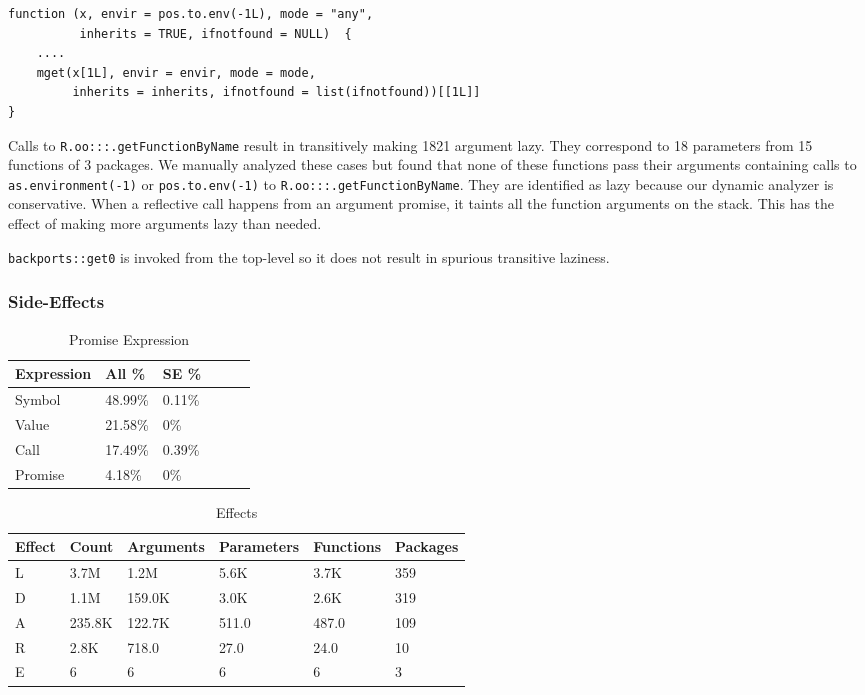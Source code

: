 \documentclass[review,nonacm,screen,acmsmall,anonymous=true]{acmart}
\newcommand{\code}[1]{\lstinline |#1|\xspace}
\begin{document}
\begin{lstlisting}
function (x, envir = pos.to.env(-1L), mode = "any",
          inherits = TRUE, ifnotfound = NULL)  {
    ....
    mget(x[1L], envir = envir, mode = mode,
         inherits = inherits, ifnotfound = list(ifnotfound))[[1L]]
}
\end{lstlisting}

Calls to \code{R.oo:::.getFunctionByName} result in transitively making 1821
argument lazy. They correspond to 18 parameters from 15 functions of 3 packages.
We manually analyzed these cases but found that none of these functions pass
their arguments containing calls to \code{as.environment(-1)} or
\code{pos.to.env(-1)} to \code{R.oo:::.getFunctionByName}. They are identified
as lazy because our dynamic analyzer is conservative. When a reflective call
happens from an argument promise, it taints all the function arguments on the
stack. This has the effect of making more arguments lazy than needed.

\code{backports::get0} is invoked from the top-level so it does not result in
spurious transitive laziness.

\subsubsection{Side-Effects}
\begin{table}
  \vspace{-3mm}
  \small
  \caption{Promise Expression} \label{table:promexpr}
  \centering
  \begin{tabular}{llllll}
    \toprule
    \textbf{Expression}&\textbf{All \%}&\textbf{SE \%}\\
    \midrule
    Symbol&48.99\%&0.11\%\\
    Value&21.58\%&0\%\\
    Call&17.49\%&0.39\%\\
    Promise&4.18\%&0\%\\
    \bottomrule
  \end{tabular}
\end{table}

\begin{table}
  \vspace{-3mm}
  \small
  \caption{Effects} \label{table:effects}
  \centering
  \begin{tabular}{llllll}
    \toprule
    \textbf{Effect}&\textbf{Count}&\textbf{Arguments}&\textbf{Parameters}&\textbf{Functions}&\textbf{Packages}\\
    \midrule
    L&3.7M&1.2M&5.6K&3.7K&359\\
    D&1.1M&159.0K&3.0K&2.6K&319\\
    A&235.8K&122.7K&511.0&487.0&109\\
    R&2.8K&718.0&27.0&24.0&10\\
    E&6&6&6&6&3\\
    \bottomrule
  \end{tabular}
\end{table}
\end{document}
